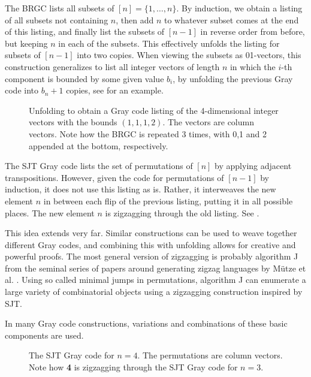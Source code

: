 \documentclass[fontsize=11pt,a4paper,DIV=12]{scrartcl}
\begin{document}
The BRGC lists all subsets of $[n]=\{1,\ldots,n\}$. By induction, we obtain a listing of all subsets not containing $n$, then add $n$ to whatever subset comes at the end of this listing, and finally list the subsets of $[n-1]$ in reverse order from before, but keeping $n$ in each of the subsets. This effectively unfolds the listing for subsets of $[n-1]$ into two copies. When viewing the subsets as 01-vectors, this construction generalizes to list all integer vectors of length $n$ in which the $i$-th component is bounded by some given value $b_i$, by unfolding the previous Gray code into $b_n+1$ copies, see  for an example. 

\begin{figure}
    \centering
    
    \caption{Unfolding to obtain a Gray code listing of the 4-dimensional integer vectors with the bounds $(1,1,1,2)$. The vectors are column vectors. Note how the BRGC is repeated 3 times, with 0,1 and 2 appended at the bottom, respectively.}
    \label{fig:unfolding explicit}
\end{figure}

The SJT Gray code lists the set of permutations of $[n]$ by applying adjacent transpositions. However, given the code for permutations of $[n-1]$ by induction, it does not use this listing as is. Rather, it interweaves the new element $n$ in between each flip of the previous listing, putting it in all possible places. The new element $n$ is zigzagging through the old listing. See .

This idea extends very far. Similar constructions can be used to weave together different Gray codes, and combining this with unfolding allows for creative and powerful proofs. The most general version of zigzagging is probably algorithm J from the seminal series of papers around generating zigzag languages by Mütze et al. \cite{PL1,PL2,PL3,PL4,PL5}. Using so called minimal jumps in permutations, algorithm J can enumerate a large variety of combinatorial objects using a zigzagging construction inspired by SJT.

In many Gray code constructions, variations and combinations of these basic components are used.

\begin{figure}
    \centering
    
    \caption{The SJT Gray code for $n=4$. The permutations are column vectors. Note how \textbf{4} is zigzagging through the SJT Gray code for $n=3$.}
    \label{fig:SJT_explicit}
\end{figure}
\end{document}
